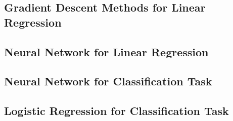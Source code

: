 \subsection{Gradient Descent Methods for Linear Regression}

\subsection{Neural Network for Linear Regression}

\subsection{Neural Network for Classification Task}

\subsection{Logistic Regression for Classification Task}